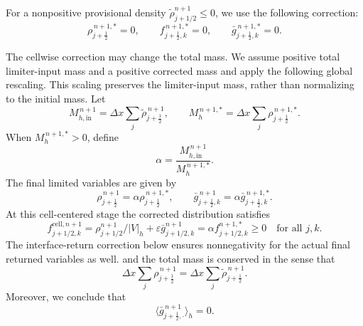 \documentclass[11pt,twoside]{article}
\numberwithin{equation}{section}
\theoremstyle{plain}
\theoremstyle{nonumberplain}
\newif\ifrevisionred
\DeclareRobustCommand{\st}[1]{{\ifrevisionred\color{red}\fi #1}}
\newenvironment{revisionblock}{\begingroup\ifrevisionred\color{red}\fi}{\endgroup}
\begin{document}
\st{For a nonpositive provisional density $\tilde\rho_{j+1/2}^{n+1}\le0$, we use the following correction:}
\[
    \rho_{j+\frac12}^{\,n+1,*}=0,
    \qquad
    f_{j+\frac12,k}^{\,n+1,*}=0,
    \qquad
    \bar g_{j+\frac12,k}^{\,n+1,*}=0 .
\]

\st{The cellwise correction may change the total mass. We assume positive total limiter-input mass and a positive corrected mass and apply the following global rescaling. This scaling preserves the limiter-input mass, rather than normalizing to the initial mass.} Let
\[
    \st{M_{h,\mathrm{in}}^{\,n+1}}
    =
    \Delta x\sum_j \tilde\rho_{j+\frac12}^{\,n+1},
    \qquad
    M_h^{\,n+1,*}
    =
    \Delta x\sum_j \rho_{j+\frac12}^{\,n+1,*}.
\]
When \(M_h^{\,n+1,*}>0\), define
\[
    \alpha
    =
    \frac{\st{M_{h,\mathrm{in}}^{\,n+1}}}{M_h^{\,n+1,*}} .
\]
The final limited variables are given by
\[
    \rho_{j+\frac12}^{\,n+1}
    =
    \alpha \rho_{j+\frac12}^{\,n+1,*},
    \qquad
    \bar g_{j+\frac12,k}^{\,n+1}
    =
    \alpha \bar g_{j+\frac12,k}^{\,n+1,*}.
\]
\begin{revisionblock}
At this cell-centered stage the corrected distribution satisfies
\[
f_{j+1/2,k}^{\mathrm{cell},n+1}
=\rho_{j+1/2}^{n+1}/|V|_h+\varepsilon\bar g_{j+1/2,k}^{n+1}
=\alpha f_{j+1/2,k}^{n+1,*}\ge0\quad\text{for all }j,k.
\]
The interface-return correction below ensures nonnegativity for the actual
final returned variables as well.
\end{revisionblock}
and the total mass is conserved in the sense that
\[
    \Delta x\sum_j \rho_{j+\frac12}^{\,n+1}
    =
    \Delta x\sum_j \tilde\rho_{j+\frac12}^{\,n+1}.
\]
Moreover, we conclude that
\[
    \langle \bar g_{j+\frac12,\cdot}^{\,n+1}\rangle_h=0 .
\]
\end{document}
